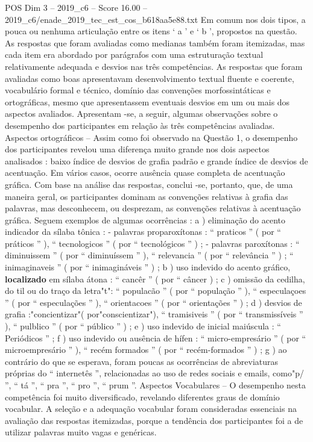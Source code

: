 \begin{textsample}{POS Dim 3 – 2019\_c6 – Score 16.00 – 2019\_c6/enade\_2019\_tec\_est\_cos\_b618aa5e88.txt}
Em comum nos dois tipos, a pouca ou nenhuma articulação entre os itens ‘ a ’ e ‘ b ’, propostos na questão.
As respostas que foram avaliadas como medianas também foram itemizadas, mas cada item era abordado por parágrafos com uma estruturação textual relativamente adequada e desvios nas três competências.
As respostas que foram avaliadas como boas apresentavam desenvolvimento textual fluente e coerente, vocabulário formal e técnico, domínio das convenções morfossintáticas e ortográficas, mesmo que apresentassem eventuais desvios em um ou mais dos aspectos avaliados.
Apresentam -se, a seguir, algumas observações sobre o desempenho dos participantes em relação às três competências avaliadas.
Aspectos ortográficos – Assim como foi observado na Questão 1, o desempenho dos participantes revelou uma diferença muito grande nos dois aspectos analisados : baixo índice de desvios de grafia padrão e grande índice de desvios de acentuação.
Em vários casos, ocorre ausência quase completa de acentuação gráfica.
Com base na análise das respostas, conclui -se, portanto, que, de uma maneira geral, os participantes dominam as convenções relativas à grafia das palavras, mas desconhecem, ou desprezam, as convenções relativas à acentuação gráfica.
Seguem exemplos de algumas ocorrências : a ) eliminação do acento indicador da sílaba tônica : - palavras proparoxítonas : “ praticos ” ( por “ práticos ” ), “ tecnologicos ” ( por “ tecnológicos ” ) ; - palavras paroxítonas : “ diminuissem ” ( por “ diminuíssem ” ), “ relevancia ” ( por “ relevância ” ) ; “ inimaginaveis ” ( por “ inimagináveis ” ) ; b ) uso indevido do acento gráfico, \textbf{localizado} em sílaba átona : “ cancêr ” ( por “ câncer ) ; c ) omissão da cedilha, do til ou do traço da letra"t": “ populacão ” ( por “ população ” ), “ especulaçoes ” ( por “ especulações ” ), “ orientacoes ” ( por “ orientações ” ) ; d ) desvios de grafia :"concientizar"( por"conscientizar"), “ tramisiveis ” ( por “ transmissíveis ” ), “ pulblico ” ( por “ público ” ) ; e ) uso indevido de inicial maiúscula : “ Periódicos ” ; f ) uso indevido ou ausência de hífen : “ micro-empresário ” ( por “ microempresário ” ), “ recém formados ” ( por “ recém-formados ” ) ; g ) ao contrário do que se esperava, foram poucas as ocorrências de abreviaturas próprias do “ internetês ”, relacionadas ao uso de redes sociais e emails, como"p/ ”, “ tá ”, “ pra ”, “ pro ”, “ prum ”.
Aspectos Vocabulares – O desempenho nesta competência foi muito diversificado, revelando diferentes graus de domínio vocabular.
A seleção e a adequação vocabular foram consideradas essenciais na avaliação das respostas itemizadas, porque a tendência dos participantes foi a de utilizar palavras muito vagas e genéricas.

\end{textsample}

